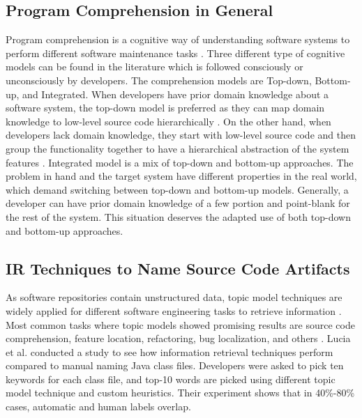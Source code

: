 \subsection{Program Comprehension in General}
\label{related:program_comprehension}
Program comprehension is a cognitive way of understanding software systems to perform different software maintenance tasks \cite{wei2002surveyCategorizationComprehension, siegmund2016programPastFuture}. Three different type of cognitive models \cite{tilley1998reverseEngineeringFramework, von1993programToolRequirements, siegmund2016programPastFuture} can be found in the literature which is followed consciously or unconsciously by developers. The comprehension models are Top-down, Bottom-up, and Integrated. When developers have prior domain knowledge about a software system, the top-down model is preferred as they can map domain knowledge to low-level source code hierarchically \cite{brooks1983theoryComprehensionPrograms}. On the other hand, when developers lack domain knowledge, they start with low-level source code and then group the functionality together to have a hierarchical abstraction of the system features \cite{shneiderman1979syntacticInteractionsModel, pennington1987stimulusMentalRepresentations}. Integrated model \cite{shaft1995relevanceDomainKnowledge, von1993programToolRequirements} is a mix of top-down and bottom-up approaches. The problem in hand and the target system have different properties in the real world, which demand switching between top-down and bottom-up models. Generally, a developer can have prior domain knowledge of a few portion and point-blank for the rest of the system. This situation deserves the adapted use of both top-down and bottom-up approaches.   


\subsection{IR Techniques to Name Source Code Artifacts}
\label{related:IR}
As software repositories contain unstructured data, topic model techniques are widely applied for different software engineering tasks to retrieve information \cite{chen2016topicMiningRepositories, panichella2013topicModelsTasks, sun2016surveyTopicSE}. Most common tasks where topic models showed promising results are source code comprehension, feature location, refactoring, bug localization, and others \cite{sun2016surveyTopicSE}. Lucia et al. \cite{de2012IRMethodsArtifacts} conducted a study to see how information retrieval techniques perform compared to manual naming Java class files. Developers were asked to pick ten keywords for each class file, and top-10 words are picked using different topic model technique and custom heuristics. Their experiment shows that in 40\%-80\% cases, automatic and human labels overlap. 

